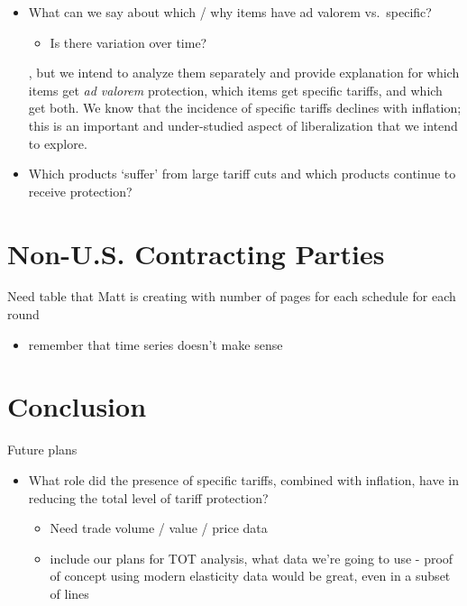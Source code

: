 \documentclass[
  12pt,
]{article}
\providecommand{\tightlist}{%
  \setlength{\itemsep}{0pt}\setlength{\parskip}{0pt}}
\begin{document}
\begin{itemize}
\item
  What can we say about which / why items have ad valorem vs.~specific?

  \begin{itemize}
  \tightlist
  \item
    Is there variation over time?
  \end{itemize}

  , but we intend to analyze them separately and provide explanation for which items get \emph{ad valorem} protection, which items get specific tariffs, and which get both. We know that the incidence of specific tariffs declines with inflation; this is an important and under-studied aspect of liberalization that we intend to explore.
\item
  Which products `suffer' from large tariff cuts and which products continue to receive protection?
\end{itemize}

\hypertarget{non-u.s.-contracting-parties}{%
\section{Non-U.S. Contracting Parties}\label{non-u.s.-contracting-parties}}

Need table that Matt is creating with number of pages for each schedule for each round

\begin{itemize}
\tightlist
\item
  remember that time series doesn't make sense
\end{itemize}

\hypertarget{conclusion}{%
\section{Conclusion}\label{conclusion}}

Future plans

\begin{itemize}
\item
  What role did the presence of specific tariffs, combined with inflation, have in reducing the total level of tariff protection?

  \begin{itemize}
  \item
    Need trade volume / value / price data
  \item
    include our plans for TOT analysis, what data we're going to use - proof of concept using modern elasticity data would be great, even in a subset of lines
  \end{itemize}
\end{itemize}
\end{document}
